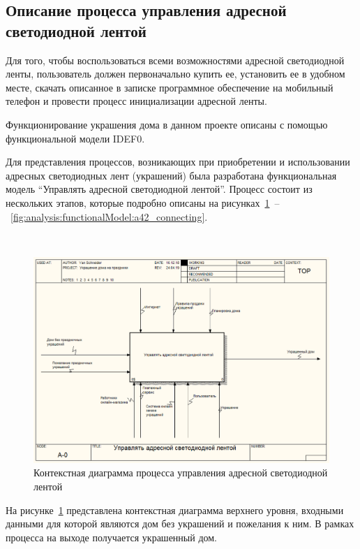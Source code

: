 \subsection{Описание процесса управления адресной светодиодной лентой}
\label{sec:analysis:businessProccess}

Для того, чтобы воспользоваться всеми возможностями адресной светодиодной ленты, пользователь должен первоначально купить ее, установить ее в удобном месте, скачать описанное в записке программное обеспечение на мобильный телефон и провести процесс инициализации адресной ленты.

Функционирование украшения дома в данном проекте описаны с помощью функциональной модели IDEF0.

Для представления процессов, возникающих при приобретении и использовании адресных светодиодных лент (украшений) была разработана функциональная модель \enquote{Управлять адресной светодиодной лентой}. Процесс состоит из нескольких этапов, которые подробно описаны на рисунках~\ref{fig:analysis:functionalModel:main}~–~\ref{fig:analysis:functionalModel:a42_connecting}.

~
\begin{figure}[H]
\centering
	\includegraphics[scale=0.45]{figures/functionalModel/main.png}
	\caption{Контекстная диаграмма процесса управления адресной светодиодной лентой}
	\label{fig:analysis:functionalModel:main}
\end{figure}

На рисунке~\ref{fig:analysis:functionalModel:main} представлена контекстная диаграмма верхнего уровня, входными данными для которой являются дом без украшений и пожелания к ним. В рамках процесса на выходе получается украшенный дом. 

